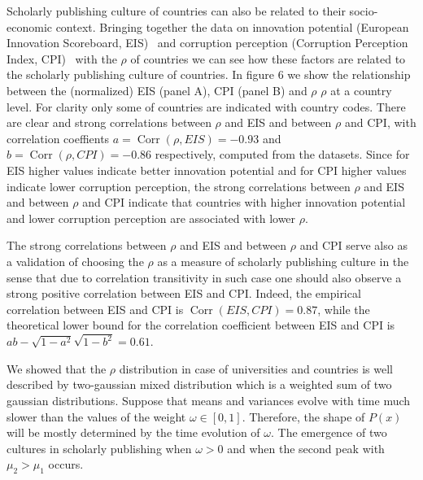 \documentclass[amsfonts, amssymb, prl, superscriptaddress, notitlepage, twocolumn, nofootinbib]{revtex4-2}
\newcommand{\Corr}{\operatorname{Corr}}
\begin{document}
Scholarly publishing culture of countries can also be related to their socio-economic context. Bringing together the data on innovation potential (European Innovation Scoreboard, EIS)~\cite{european_innovation_scoreboard_2023} and corruption perception (Corruption Perception Index, CPI)~\cite{transparency_international_cpi_2022} with the $\rho$ of countries we can see how these factors are related to the scholarly publishing culture of countries. In figure 6 we show the relationship between the (normalized) EIS (panel A), CPI (panel B) and $\rho$ $\rho$ at a country level. For clarity only some of countries are indicated with country codes.
There are clear and strong correlations between $\rho$ and EIS and between $\rho$ and CPI, with correlation coeffients $a=\Corr(\rho, EIS)=-0.93$ and $b=\Corr(\rho, CPI)=-0.86$ respectively, computed from the datasets. Since for EIS higher values indicate better innovation potential and for CPI higher values indicate lower corruption perception, the strong correlations between $\rho$ and EIS and between $\rho$ and CPI indicate that countries with higher innovation potential and lower corruption perception are associated with lower $\rho$. 

The strong correlations between $\rho$ and EIS and between $\rho$ and CPI serve also as a validation of choosing the $\rho$ as a measure of scholarly publishing culture in the sense that due to correlation transitivity in such case one should also observe a strong positive correlation between EIS and CPI. Indeed, the empirical correlation between EIS and CPI is $\Corr(EIS, CPI)=0.87$, while the theoretical lower bound for the correlation coefficient between EIS and CPI is $ab-\sqrt{1-a^2}\sqrt{1-b^2}=0.61$.

We showed that the $\rho$ distribution in case of universities and countries is well described by two-gaussian mixed distribution which is a weighted sum of two gaussian distributions. Suppose that means and variances evolve with time much slower than the values of the weight $\omega\in [0, 1]$.  Therefore, the shape of $P(x)$ will be mostly determined by the time evolution of $\omega$. The emergence of two cultures in scholarly publishing when $\omega > 0$ and when the second peak with $\mu_2 >\mu_1$ occurs.  
\end{document}

